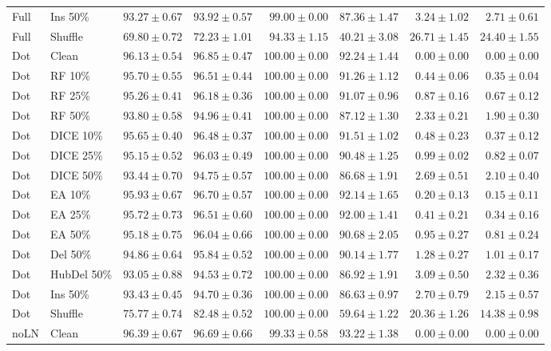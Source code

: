 {\begin{longtable}{llrrrrrr}
Full & Ins 50\% & $93.27\pm0.67$ & $93.92\pm0.57$ & $99.00\pm0.00$ & $87.36\pm1.47$ & $3.24\pm1.02$ & $2.71\pm0.61$ \\
Full & Shuffle & $69.80\pm0.72$ & $72.23\pm1.01$ & $94.33\pm1.15$ & $40.21\pm3.08$ & $26.71\pm1.45$ & $24.40\pm1.55$ \\
Dot & Clean & $96.13\pm0.54$ & $96.85\pm0.47$ & $100.00\pm0.00$ & $92.24\pm1.44$ & $0.00\pm0.00$ & $0.00\pm0.00$ \\
Dot & RF 10\% & $95.70\pm0.55$ & $96.51\pm0.44$ & $100.00\pm0.00$ & $91.26\pm1.12$ & $0.44\pm0.06$ & $0.35\pm0.04$ \\
Dot & RF 25\% & $95.26\pm0.41$ & $96.18\pm0.36$ & $100.00\pm0.00$ & $91.07\pm0.96$ & $0.87\pm0.16$ & $0.67\pm0.12$ \\
Dot & RF 50\% & $93.80\pm0.58$ & $94.96\pm0.41$ & $100.00\pm0.00$ & $87.12\pm1.30$ & $2.33\pm0.21$ & $1.90\pm0.30$ \\
Dot & DICE 10\% & $95.65\pm0.40$ & $96.48\pm0.37$ & $100.00\pm0.00$ & $91.51\pm1.02$ & $0.48\pm0.23$ & $0.37\pm0.12$ \\
Dot & DICE 25\% & $95.15\pm0.52$ & $96.03\pm0.49$ & $100.00\pm0.00$ & $90.48\pm1.25$ & $0.99\pm0.02$ & $0.82\pm0.07$ \\
Dot & DICE 50\% & $93.44\pm0.70$ & $94.75\pm0.57$ & $100.00\pm0.00$ & $86.68\pm1.91$ & $2.69\pm0.51$ & $2.10\pm0.40$ \\
Dot & EA 10\% & $95.93\pm0.67$ & $96.70\pm0.57$ & $100.00\pm0.00$ & $92.14\pm1.65$ & $0.20\pm0.13$ & $0.15\pm0.11$ \\
Dot & EA 25\% & $95.72\pm0.73$ & $96.51\pm0.60$ & $100.00\pm0.00$ & $92.00\pm1.41$ & $0.41\pm0.21$ & $0.34\pm0.16$ \\
Dot & EA 50\% & $95.18\pm0.75$ & $96.04\pm0.66$ & $100.00\pm0.00$ & $90.68\pm2.05$ & $0.95\pm0.27$ & $0.81\pm0.24$ \\
Dot & Del 50\% & $94.86\pm0.64$ & $95.84\pm0.52$ & $100.00\pm0.00$ & $90.14\pm1.77$ & $1.28\pm0.27$ & $1.01\pm0.17$ \\
Dot & HubDel 50\% & $93.05\pm0.88$ & $94.53\pm0.72$ & $100.00\pm0.00$ & $86.92\pm1.91$ & $3.09\pm0.50$ & $2.32\pm0.36$ \\
Dot & Ins 50\% & $93.43\pm0.45$ & $94.70\pm0.36$ & $100.00\pm0.00$ & $86.63\pm0.97$ & $2.70\pm0.79$ & $2.15\pm0.57$ \\
Dot & Shuffle & $75.77\pm0.74$ & $82.48\pm0.52$ & $100.00\pm0.00$ & $59.64\pm1.22$ & $20.36\pm1.26$ & $14.38\pm0.98$ \\
noLN & Clean & $96.39\pm0.67$ & $96.69\pm0.66$ & $99.33\pm0.58$ & $93.22\pm1.38$ & $0.00\pm0.00$ & $0.00\pm0.00$ \\

\end{longtable}}
